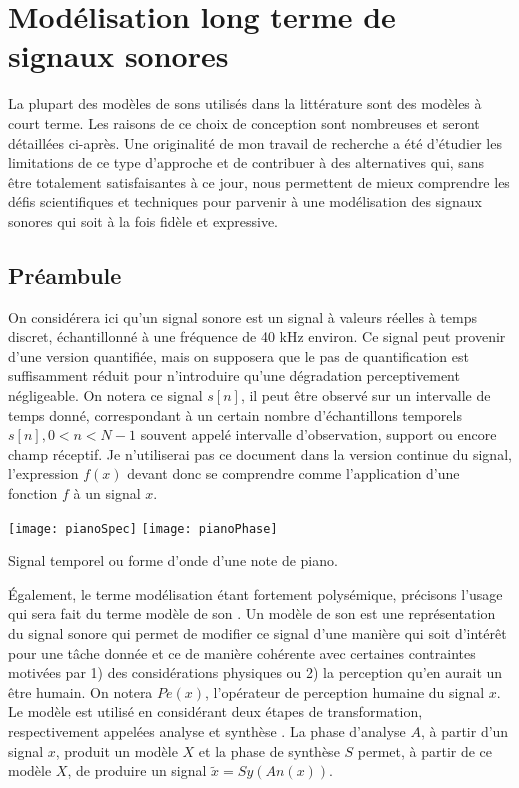 \chapter{\nmu Modélisation long terme de signaux sonores} \label{chap:modeles}

La plupart des modèles de sons utilisés dans la littérature sont des modèles à court terme. Les raisons de ce choix de conception sont nombreuses et seront détaillées ci-après. Une originalité de mon travail de recherche a été d'étudier les limitations de ce type d'approche et de contribuer à des alternatives qui, sans être totalement satisfaisantes à ce jour, nous permettent de mieux comprendre les défis scientifiques et techniques pour parvenir à une modélisation des signaux sonores qui soit à la fois fidèle et expressive.

\section{ \nmu Préambule}

On considérera ici qu'un signal sonore est un signal à valeurs réelles à temps discret, échantillonné à une fréquence de 40 kHz environ. Ce signal peut provenir d'une version quantifiée, mais on supposera que le pas de quantification est suffisamment réduit pour n'introduire qu'une dégradation perceptivement négligeable. On notera ce signal $s[n]$, il peut être observé sur un intervalle de temps donné, correspondant à un certain nombre d'échantillons temporels $s[n], 0<n<N-1$ souvent appelé intervalle d'observation, support ou encore champ réceptif. Je n'utiliserai pas ce document dans la version continue du signal, l'expression $f(x)$ devant donc se comprendre comme l'application d'une fonction $f$ à un signal $x$.

\begin{marginfigure}
  \texttt{[image: pianoSpec]}
  \texttt{[image: pianoPhase]}
  \caption{Signal temporel ou forme d'onde d'une note de piano.}
  \label{fig:onde}
\end{marginfigure}

Également, le terme modélisation étant fortement polysémique, précisons l'usage qui sera fait du terme \og modèle de son \fg. Un modèle de son est une représentation du signal sonore qui permet de modifier ce signal d'une manière qui soit d'intérêt pour une tâche donnée et ce de manière cohérente avec certaines contraintes motivées par 1) des considérations physiques ou 2) la perception qu'en aurait un être humain. On notera $Pe(x)$, l'opérateur de perception humaine du signal $x$.  Le modèle est utilisé en considérant deux étapes de transformation, respectivement appelées \og analyse \fg et \og synthèse \fg. La phase d'analyse $A$, à partir d'un signal $x$, produit un modèle $X$ et la phase de synthèse $S$ permet, à partir de ce modèle $X$, de produire un signal $\tilde{x}=Sy(An(x))$.

